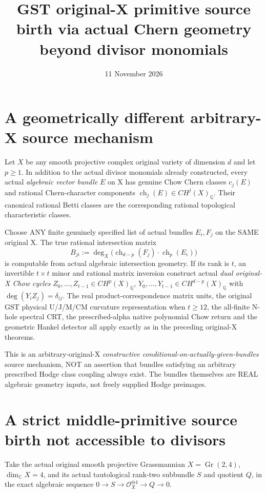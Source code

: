 \documentclass[11pt]{article}
\title{GST original-X primitive source birth via actual Chern geometry beyond divisor monomials}
\date{11 November 2026}
\begin{document}
\maketitle

\section{A geometrically different arbitrary-X source mechanism}

Let $X$ be any smooth projective complex original variety of
dimension $d$ and let $p\ge1$. In addition to the actual
divisor monomials already constructed, every actual
\emph{algebraic vector bundle} $E$ on X has genuine Chow
Chern classes $c_j(E)$ and rational Chern-character
components $\operatorname{ch}_j(E)\in CH^j(X)_{\mathbb Q}$.
Their canonical rational Betti classes are the corresponding
rational topological characteristic classes.

Choose ANY finite genuinely specified list of actual bundles
$E_i,F_j$ on the SAME original X. The true rational intersection
matrix
\[
B_{ji}:=\deg_X\bigl(\operatorname{ch}_{d-p}(F_j)
                   \cdot \operatorname{ch}_{p}(E_i)\bigr)
\]
is computable from actual algebraic intersection geometry.
If its rank is $t$, an invertible $t\times t$ minor and
rational matrix inversion construct actual
\emph{dual original-X Chow cycles}
$Z_0,\ldots,Z_{t-1}\in CH^p(X)_{\mathbb Q}$,
$Y_0,\ldots,Y_{t-1}\in CH^{d-p}(X)_{\mathbb Q}$
with $\deg(Y_iZ_j)=\delta_{ij}$.
The real product-correspondence matrix units,
the original GST physical U/J/M/CM curvature representation
when $t\ge12$, the all-finite N-hole spectral CRT,
the prescribed-alpha native polynomial Chow return and
the geometric Hankel detector all apply exactly as in
the preceding original-X theorems.

This is an arbitrary-original-X \emph{constructive
conditional-on-actually-given-bundles} source mechanism,
NOT an assertion that bundles satisfying an arbitrary
prescribed Hodge class coupling always exist.
The bundles themselves are REAL algebraic geometry
inputs, not freely supplied Hodge preimages.

\section{A strict middle-primitive source birth not accessible to divisors}

Take the actual original smooth projective Grassmannian
$X=\operatorname{Gr}(2,4)$, $\dim_{\mathbb C}X=4$,
and its actual tautological rank-two subbundle
$S$ and quotient $Q$, in the exact algebraic
sequence $0\to S\to\mathcal O_X^{\oplus4}\to Q\to0$.
\end{document}
